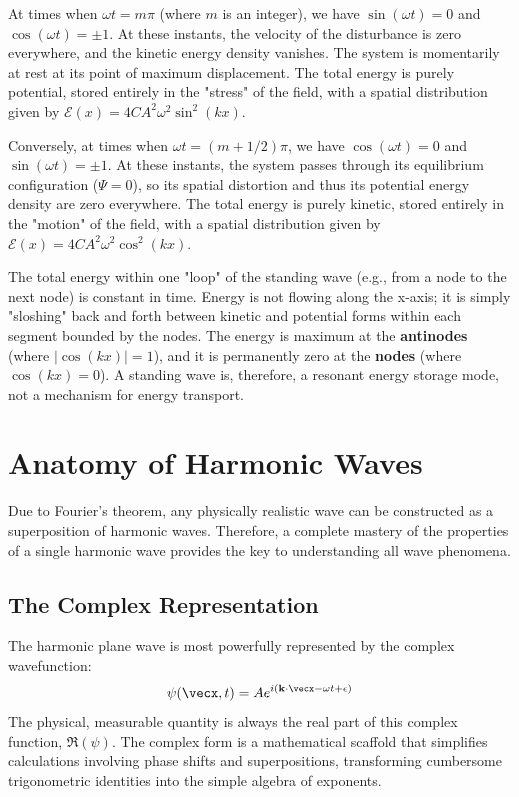 \begin{proposition}
At times when $\omega t = m\pi$ (where $m$ is an integer), we have $\sin(\omega t)=0$ and $\cos(\omega t)=\pm 1$. At these instants, the velocity of the disturbance is zero everywhere, and the kinetic energy density vanishes. The system is momentarily at rest at its point of maximum displacement. The total energy is purely potential, stored entirely in the "stress" of the field, with a spatial distribution given by $\mathcal{E}(x) = 4CA^2\omega^2 \sin^2(kx)$.

Conversely, at times when $\omega t = (m+1/2)\pi$, we have $\cos(\omega t)=0$ and $\sin(\omega t)=\pm 1$. At these instants, the system passes through its equilibrium configuration ($\Psi=0$), so its spatial distortion and thus its potential energy density are zero everywhere. The total energy is purely kinetic, stored entirely in the "motion" of the field, with a spatial distribution given by $\mathcal{E}(x) = 4CA^2\omega^2 \cos^2(kx)$.

The total energy within one "loop" of the standing wave (e.g., from a node to the next node) is constant in time. Energy is not flowing along the x-axis; it is simply "sloshing" back and forth between kinetic and potential forms within each segment bounded by the nodes. The energy is maximum at the \textbf{antinodes} (where $|\cos(kx)|=1$), and it is permanently zero at the \textbf{nodes} (where $\cos(kx)=0$). A standing wave is, therefore, a resonant energy storage mode, not a mechanism for energy transport.
\end{proposition}

\section{Anatomy of Harmonic Waves}

Due to Fourier's theorem, any physically realistic wave can be constructed as a superposition of harmonic waves. Therefore, a complete mastery of the properties of a single harmonic wave provides the key to understanding all wave phenomena.

\subsection{The Complex Representation}

\begin{definition}
The harmonic plane wave is most powerfully represented by the complex wavefunction:
$$ \psi(\vecx, t) = A e^{i(\vecbf{k} \cdot \vecx - \omega t + \epsilon)} $$
The physical, measurable quantity is always the real part of this complex function, $\Re(\psi)$. The complex form is a mathematical scaffold that simplifies calculations involving phase shifts and superpositions, transforming cumbersome trigonometric identities into the simple algebra of exponents.
\end{definition}

